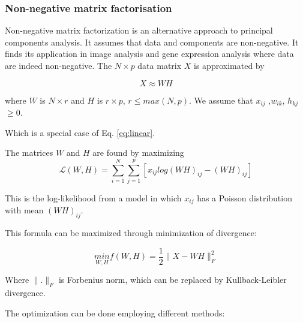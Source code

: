 \documentclass[12pt,]{book}
\theoremstyle{definition}
\theoremstyle{definition}
\theoremstyle{definition}
\theoremstyle{remark}
\begin{document}
\hypertarget{non-negative-matrix-factorisation}{%
\subsubsection{Non-negative matrix
factorisation}\label{non-negative-matrix-factorisation}}

Non-negative matrix factorization \citep{Seung1999} is an alternative
approach to principal components analysis. It assumes that data and
components are non-negative. It finds its application in image analysis
and gene expression analysis where data are indeed non-negative. The
\(N \times p\) data matrix \(X\) is approximated by

\[X \approx WH \]

where \(W\) is \(N \times r\) and \(H\) is \(r \times p\),
\(r ≤ max(N,p)\). We assume that \(x_{ij}\) ,\(w_{ik}\),
\(h_{kj}\)\(\geq 0\).

Which is a special case of Eq. \eqref{eq:linear}.

The matrices \(W\) and \(H\) are found by maximizing \begin{equation}
\mathcal{L}(W, H) = \sum^N_{i=1}\sum^{p}_{j=1}[x_{ij} log(WH)_{ij} − (WH)_{ij} ] \label{eq:nmf}
\end{equation}

This is the log-likelihood from a model in which \(x_{ij}\) has a
Poisson distribution with mean \((WH)_{ij}\).

This formula can be maximized through minimization of divergence:

\begin{equation}
\underset{W,H}{min} f(W,H)  = \frac{1}{2}\rVert X-WH\rVert^2_F \label{eq:divNMF}
\end{equation}

Where \(\rVert .\rVert_F\) is Forbenius norm, which can be replaced by
Kullback-Leibler divergence.

The optimization can be done employing different methods:
\end{document}
